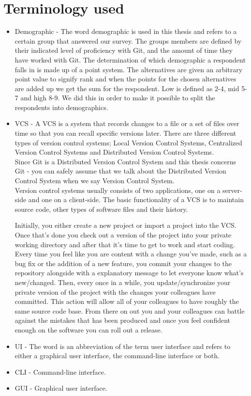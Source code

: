 \documentclass[a4paper,oneside]{bth} %
\begin{document}
			\section{Terminology used}
			\begin{itemize}
				\item Demographic - The word demographic is used in this thesis and refers to a certain group that answered our survey. The groups members are defined by their indicated level of proficiency with Git, and the amount of time they have worked with Git. The determination of which demographic a respondent falls in is made up of a point system. The alternatives are given an arbitrary point value to signify rank and when the points for the chosen alternatives are added up we get the sum for the respondent. Low is defined as 2-4, mid 5-7 and high 8-9. We did this in order to make it possible to split the respondents into demographics.
				\item VCS - A VCS is a system that records changes to a file or a set of files over time so that you can recall specific versions later.
				There are three different types of version control systems; Local Version Control Systems, Centralized Version Control Systems and Distributed Version Control Systems.\\
				Since Git is a Distributed Version Control System and this thesis concerns Git - you can safely assume that we talk about the Distributed Version Control System when we say Version Control System.\cite{typesOfVCS}\\
				Version control systems usually consists of two applications, one on a server-side and one on a client-side.
				The basic functionality of a VCS is to maintain source code, other types of software files and their history.\cite{FoundationVCforWebDevs}
				
				Initially, you either create a new project or import a project into the VCS.
				Once that's done you check out a version of the project into your private working directory and after that it's time to get to work and start coding.
				Every time you feel like you are content with a change you've made, such as a bug fix or the addition of a new feature, you commit your changes to the repository alongside with a explanatory message to let everyone know what's new/changed.
				Then, every once in a while, you update/synchronize your private version of the project with the changes your colleagues have committed.
				This action will allow all of your colleagues to have roughly the same source code base. From there on out you and your colleagues can battle against the mistakes that has been produced  and once you feel confident enough on the software you can roll out a release.\cite{vcsExplanation}
				\item UI - The word is an abbreviation of the term user interface and refers to either a graphical user interface, the command-line interface or both.
				\item CLI - Command-line interface.
				\item GUI - Graphical user interface.
			\end{itemize}
			
\end{document}
